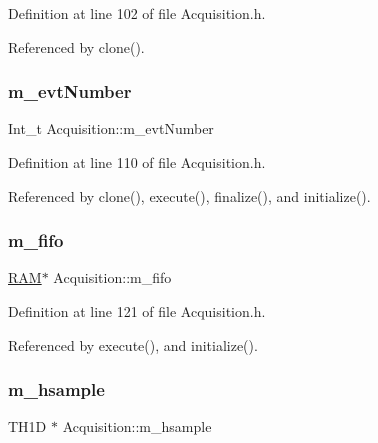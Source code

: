 Definition at line 102 of file Acquisition.\+h.



Referenced by clone().

\mbox{\label{classAcquisition_a32a70daa3f653eae5eafc46dbd0e11a6}} 
\subsubsection{\texorpdfstring{m\+\_\+evt\+Number}{m\_evtNumber}}
{\footnotesize\ttfamily Int\+\_\+t Acquisition\+::m\+\_\+evt\+Number\hspace{0.3cm}{\ttfamily [private]}}



Definition at line 110 of file Acquisition.\+h.



Referenced by clone(), execute(), finalize(), and initialize().

\mbox{\label{classAcquisition_a8a893e7485e96da01185df6d1109c0bc}} 
\subsubsection{\texorpdfstring{m\+\_\+fifo}{m\_fifo}}
{\footnotesize\ttfamily \hyperlink{classRAM}{R\+AM}$\ast$ Acquisition\+::m\+\_\+fifo\hspace{0.3cm}{\ttfamily [private]}}



Definition at line 121 of file Acquisition.\+h.



Referenced by execute(), and initialize().

\mbox{\label{classAcquisition_ad0078b0c53eb14f13fdd16763df3be8e}} 
\subsubsection{\texorpdfstring{m\+\_\+hsample}{m\_hsample}}
{\footnotesize\ttfamily T\+H1D $\ast$ Acquisition\+::m\+\_\+hsample\hspace{0.3cm}{\ttfamily [private]}}




